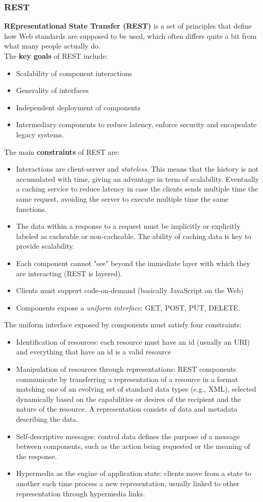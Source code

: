 \documentclass[10pt,a4paper]{article}
\begin{document}
\subsubsection{REST}
\textbf{REpresentational State Transfer (REST)} is a set of principles that define how Web standards are supposed to be used, which often differs quite a bit from what many people actually do. \\
The \textbf{key goals} of REST include:
\begin{itemize}
	\item Scalability of component interactions
	\item Generality of interfaces
	\item Independent deployment of components
	\item Intermediary components to reduce latency, enforce security and encapsulate legacy systems.
\end{itemize}
The main \textbf{constraints} of REST are:
\begin{itemize}
	\item Interactions are client-server and \textit{stateless}. This means that the history is not accumulated with time, giving an advantage in term of scalability. Eventually a caching service to reduce latency in case the clients sends multiple time the same request, avoiding the server to execute multiple time the same functions.
	\item The data within a response to a request must be implicitly or explicitly labeled as cacheable or non-cacheable. The ability of caching data is key to provide scalability.
	\item Each component cannot "see" beyond the immediate layer with which they are interacting (REST is layered).
	\item Clients must support code-on-demand (basically JavaScript on the Web)
	\item Components expose a \textit{uniform interface}: GET, POST, PUT, DELETE.
\end{itemize}
The uniform interface exposed by components must satisfy four constraints:
\begin{itemize}
	\item Identification of resources: each resource must have an id (usually an URI) and everything that have an id is a valid resource
	\item Manipulation of resources through representations: REST components communicate by transferring a representation of a resource in a format matching one of an evolving set of standard data types (e.g., XML), selected dynamically based on the capabilities or desires of the recipient and the nature of the resource. A representation consists of data and metadata describing the data.
	\item Self-descriptive messages: control data defines the purpose of a message between components, such as the action being requested or the meaning of the response. 
	\item Hypermedia as the engine of application state: clients move from a state to another each time process a new representation, usually linked to other representation through hypermedia links.
\end{itemize}
\end{document}
